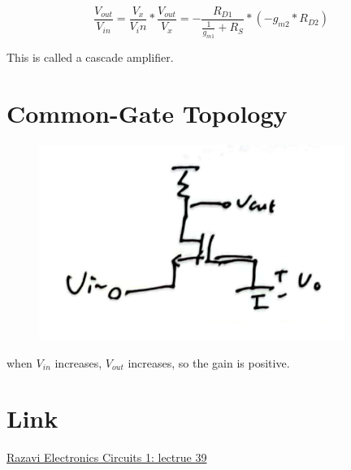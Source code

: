 \documentclass[fontset=windows]{article}
\begin{document}
$$\frac{V_{out}}{V_{in}}=\frac{V_x}{V_in}*\frac{V_{out}}{V_x}=-\frac{R_{D1}}{\frac{1}{g_{m1}}+R_S}*(-g_{m2}*R_{D2})$$

This is called a cascade amplifier. 

\section*{Common-Gate Topology}

\begin{figure}[htbp]
    \centering
    \includegraphics[scale=0.6]{10.jpg}
    \captionsetup{labelformat=empty}
    \caption{}
    \label{10}
\end{figure}

when $V_{in}$ increases, $V_{out}$ increases, so the gain is positive.  

\section*{Link}

\href{https://www.bilibili.com/video/BV1FD4y1R7Ah/?p=39}{Razavi Electronics Circuits 1: lectrue 39}
\end{document}

